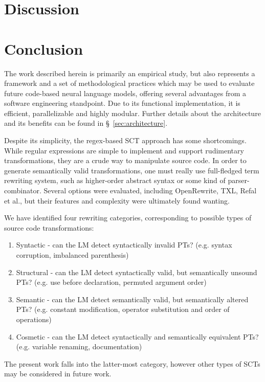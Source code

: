 \documentclass[sigconf,review,anonymous]{acmart}
\begin{document}
  \section{Discussion}

  \pagebreak
  \section{Conclusion}\label{sec:conclusion}

  The work described herein is primarily an empirical study, but also represents a framework and a set of methodological practices which may be used to evaluate future code-based neural language models, offering several advantages from a software engineering standpoint. Due to its functional implementation, it is efficient, parallelizable and highly modular. Further details about the architecture and its benefits can be found in \S~\ref{sec:architecture}.

  Despite its simplicity, the regex-based SCT approach has some shortcomings. While regular expressions are simple to implement and support rudimentary transformations, they are a crude way to manipulate source code. In order to generate semantically valid transformations, one must really use full-fledged term rewriting system, such as higher-order abstract syntax or some kind of parser-combinator. Several options were evaluated, including OpenRewrite, TXL, Refal et al., but their features and complexity were ultimately found wanting.

  We have identified four rewriting categories, corresponding to possible types of source code transformations:

  \begin{enumerate}
    \item Syntactic - can the LM detect syntactically invalid PTs? (e.g. syntax corruption, imbalanced parenthesis)
    \item Structural - can the LM detect syntactically valid, but semantically unsound PTs? (e.g. use before declaration, permuted argument order)
    \item Semantic - can the LM detect semantically valid, but semantically altered PTs? (e.g. constant modification, operator substitution and order of operations)
    \item Cosmetic - can the LM detect syntactically and semantically equivalent PTs? (e.g. variable renaming, documentation)
  \end{enumerate}

  The present work falls into the latter-most category, however other types of SCTs may be considered in future work.
\end{document}
